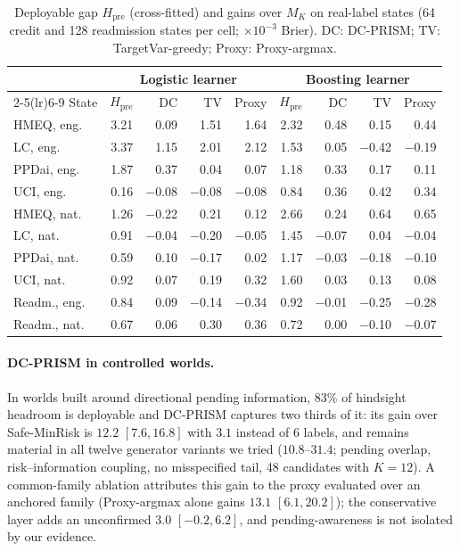 \documentclass[runningheads]{llncs}
\begin{document}
\begin{table}[t]
\caption{Deployable gap $H_{\mathrm{pre}}$ (cross-fitted) and gains over $M_K$ on real-label states (64 credit and 128 readmission states per cell; $\times10^{-3}$ Brier). DC: DC-PRISM; TV: TargetVar-greedy; Proxy: Proxy-argmax.}
\label{tab:who}
\centering\scriptsize
\setlength{\tabcolsep}{3pt}
\begin{tabular}{lrrrrrrrr}
\toprule
& \multicolumn{4}{c}{Logistic learner} & \multicolumn{4}{c}{Boosting learner} \\
\cmidrule(lr){2-5}\cmidrule(lr){6-9}
State & $H_{\mathrm{pre}}$ & DC & TV & Proxy & $H_{\mathrm{pre}}$ & DC & TV & Proxy \\
\midrule
HMEQ, eng. & 3.21 & 0.09 & 1.51 & 1.64 & 2.32 & 0.48 & 0.15 & 0.44 \\
LC, eng. & 3.37 & 1.15 & 2.01 & 2.12 & 1.53 & 0.05 & $-$0.42 & $-$0.19 \\
PPDai, eng. & 1.87 & 0.37 & 0.04 & 0.07 & 1.18 & 0.33 & 0.17 & 0.11 \\
UCI, eng. & 0.16 & $-$0.08 & $-$0.08 & $-$0.08 & 0.84 & 0.36 & 0.42 & 0.34 \\
HMEQ, nat. & 1.26 & $-$0.22 & 0.21 & 0.12 & 2.66 & 0.24 & 0.64 & 0.65 \\
LC, nat. & 0.91 & $-$0.04 & $-$0.20 & $-$0.05 & 1.45 & $-$0.07 & 0.04 & $-$0.04 \\
PPDai, nat. & 0.59 & 0.10 & $-$0.17 & 0.02 & 1.17 & $-$0.03 & $-$0.18 & $-$0.10 \\
UCI, nat. & 0.92 & 0.07 & 0.19 & 0.32 & 1.60 & 0.03 & 0.13 & 0.08 \\
Readm., eng. & 0.84 & 0.09 & $-$0.14 & $-$0.34 & 0.92 & $-$0.01 & $-$0.25 & $-$0.28 \\
Readm., nat. & 0.67 & 0.06 & 0.30 & 0.36 & 0.72 & 0.00 & $-$0.10 & $-$0.07 \\
\bottomrule
\end{tabular}
\end{table}

\paragraph{DC-PRISM in controlled worlds.} In worlds built around directional pending information, 83\% of hindsight headroom is deployable and DC-PRISM captures two thirds of it: its gain over Safe-MinRisk is $12.2$ $[7.6,16.8]$ with $3.1$ instead of 6 labels, and remains material in all twelve generator variants we tried ($10.8$--$31.4$; pending overlap, risk--information coupling, no misspecified tail, 48 candidates with $K=12$). A common-family ablation attributes this gain to the proxy evaluated over an anchored family (Proxy-argmax alone gains $13.1$ $[6.1,20.2]$); the conservative layer adds an unconfirmed $3.0$ $[-0.2,6.2]$, and pending-awareness is not isolated by our evidence.
\end{document}
